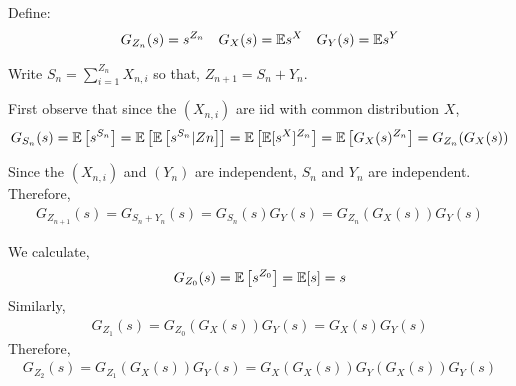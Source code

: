 \documentclass[10pt]{article}
\begin{document}
\begin{solution}[Solution]
Define:
\begin{align*}
    G_{Z_n}(s) = s^{Z_n} && G_X(s) = \mathbb{E} s^X && G_Y(s)=\mathbb{E} s^Y 
\end{align*}

Write \( S_n = \sum_{i=1}^{Z_n}X_{n,i} \) so that, \( Z_{n+1}=S_n+Y_n \).


First observe that since the \( (X_{n,i}) \) are iid with common distribution \( X \),
\begin{align*}
    G_{S_n}(s) = \mathbb{E}\left[s^{S_n}\right] = \mathbb{E}\left[\mathbb{E}\left[s^{S_n}|Zn\right]\right] = \mathbb{E} \left[ \mathbb{E}[s^X]^{Z_n} \right] = \mathbb{E} \left[ G_X(s)^{Z_n} \right] = G_{Z_n}(G_X(s))
\end{align*}

Since the \( (X_{n,i}) \) and \( (Y_n) \) are independent, \( S_n \) and \( Y_n \) are independent. Therefore,
\begin{align*}
    G_{Z_{n+1}}(s) = G_{S_n+Y_n}(s) = G_{S_n}(s)G_{Y}(s)  = G_{Z_n}(G_X(s))G_Y(s)
\end{align*}


We calculate, 
\begin{align*}
    G_{Z_0}(s) = \mathbb{E}\left[s^{Z_0}\right] = \mathbb{E}[s] = s
\end{align*}
Similarly,
\begin{align*}
    G_{Z_1}(s) = G_{Z_0}(G_X(s))G_Y(s) = G_X(s)G_Y(s) 
\end{align*}
Therefore,
\begin{align*}
    G_{Z_2}(s) = G_{Z_1}(G_X(s))G_Y(s) = G_X(G_X(s))G_Y(G_X(s))G_Y(s)
\end{align*}

\iffalse
Therefore,
\begin{align*}
    G_{Z_{n+1}} &= \EE s^{Z_{n+1}} 
    = \EE \left[s^{Y_n+\sum_{i=1}^{Z_n}X_{n,i}} \right]
    = \EE\left[\EE \left[s^{Y_n+\sum_{i=1}^{Z_n}X_{n,i}} \Big| Z_n \right]\right]
\end{align*}

Thus, since the \( (X_{n,i}) \) and \( (Y_n) \) are all independent,
\begin{align*}
    \EE\left[\EE \left[s^{Y_n+\sum_{i=1}^{Z_n}X_{n,i}} \Big| Z_n \right]\right]
    = \EE\left[\EE \left[s^{Y_n}\right]\prod_{i=1}^{Z_n}\EE \left[s^{X_{n,i}}\right]\right]
\end{align*}
Since \( (X_{n,i}) \) and \( (Y_n) \) are iid,
\begin{align*}
    \EE\left[\EE \left[s^{Y_n}\right]\prod_{i=1}^{Z_n}\EE \left[s^{X_{n,i}}\right]\right]
    = \EE\left[ (\EE s^X)^{Z_n}(\EE s^Y)\right] 
    = \EE\left[ (G_X(s)G_Y(s)^{1/Z_n})^{Z_n}\right] 
\end{align*}

Therefore,
\begin{align*}
    G_{Z_{n+1}}(s) = G_{Z_n}\left( G_X(s) G_Y(s)^{1/Z_n} \right)
\end{align*}
\fi
\end{solution}
\end{document}
